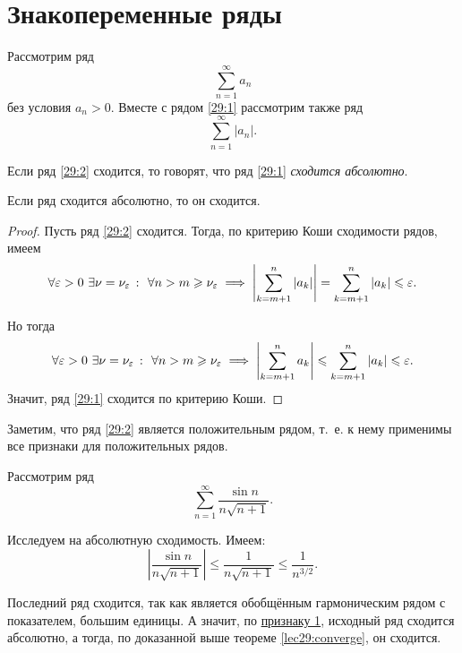 \documentclass[../../main.tex]{subfiles}
\begin{document}
	\section{Знакопеременные ряды}
	
	Рассмотрим ряд
	\begin{equation}
		\sum_{n = 1}^\infty a_n
		\label{29:1}
	\end{equation}
	без условия $a_n > 0$. Вместе с рядом \eqref{29:1} 
	рассмотрим также ряд
	\begin{equation}
		\sum_{n = 1}^\infty |a_n|.
		\label{29:2}
	\end{equation}
	\begin{definition}
		Если ряд \eqref{29:2} сходится, то говорят, что ряд \eqref{29:1} 
		\emph{сходится 
		абсолютно}.
	\end{definition}
	
	\begin{thm}\label{lec29:converge}
		Если ряд сходится абсолютно, то он сходится.
	\end{thm}
	\begin{proof}
		Пусть ряд \eqref{29:2} сходится. Тогда, по критерию Коши сходимости рядов, 
		имеем
		\[\forall \varepsilon > 0\ \exists\nu = \nu_\varepsilon\ \colon\ \forall n > 
		m \geqslant \nu_\varepsilon \implies 
		\left|\sum_{k = m + 1}^n |a_k|\right| =
		\sum_{k = m + 1}^n |a_k|\leqslant\varepsilon.\]
		
		Но тогда
		\[\forall \varepsilon > 0\ \exists\nu = \nu_\varepsilon\ \colon\ \forall n > 
		m 
		\geqslant \nu_\varepsilon \implies \left|\sum_{k = m + 1}^n a_k\right|
		\leqslant\sum_{k = m + 1}^n |a_k|\leqslant\varepsilon.\]
		Значит, ряд \eqref{29:1} сходится по критерию Коши.
	\end{proof}

\begin{remark}
	Заметим, что ряд \eqref{29:2} является положительным рядом, т.~е. к нему 
	применимы все признаки для положительных рядов.
\end{remark}
	
	\begin{example}
		Рассмотрим ряд
		\[\sum_{n = 1}^\infty \frac{\sin n}{n\sqrt{n + 1}}.\]
		
		Исследуем на абсолютную сходимость. Имеем:
		\[\left|\frac{\sin n}{n\sqrt{n + 1}}\right|\leq\frac{1}{n\sqrt{n + 
		1}}\leq\frac{1}{n^{3/2}}.\]
		
		Последний ряд сходится, так как является обобщённым гармоническим рядом с 
		показателем, большим единицы. 
		А значит, по \hyperref[lec26:comp_test_1]{признаку 1\textdegree}, 
		исходный ряд сходится абсолютно, а тогда, 
		по доказанной выше теореме \ref{lec29:converge}, он сходится.
	\end{example}
\end{document}
